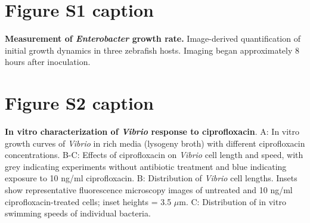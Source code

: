 \documentclass[12pt]{article}
\begin{document}
%
%
%
%
%
%
%






\newpage
\section*{Figure S1 caption}
\textbf{Measurement of \textit{Enterobacter} growth rate.} Image-derived quantification of initial growth dynamics in three zebrafish hosts. Imaging began approximately 8 hours after inoculation. 

\section*{Figure S2 caption}
\textbf{In vitro characterization of \textit{Vibrio} response to ciprofloxacin}. A: In vitro growth curves of \textit{Vibrio} in rich media (lysogeny broth) with different ciprofloxacin concentrations. B-C: Effects of ciprofloxacin on \textit{Vibrio} cell length and speed, with grey indicating experiments without antibiotic treatment and blue indicating exposure to 10 ng/ml ciprofloxacin. B: Distribution of \textit{Vibrio} cell lengths. Insets show representative fluorescence microscopy images of untreated and 10 ng/ml ciprofloxacin-treated cells; inset heights = 3.5 $\mu$m. C: Distribution of in vitro swimming speeds of individual bacteria.
\end{document}
